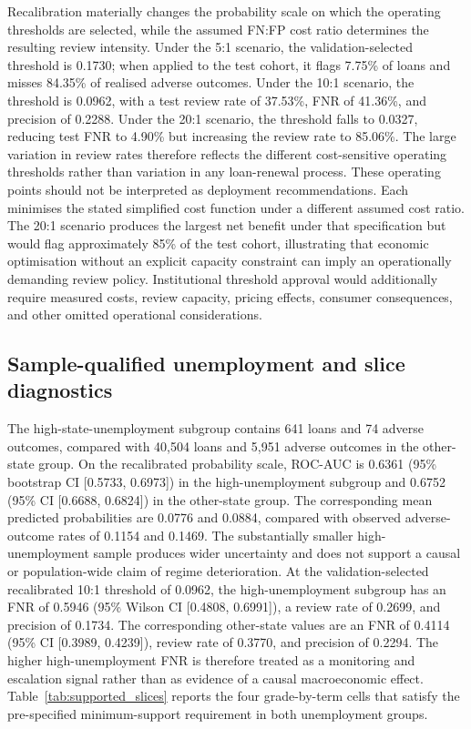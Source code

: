 \documentclass[10pt]{article}
\begin{document}
Recalibration materially changes the probability scale on which the operating thresholds are selected, while the assumed FN:FP cost ratio determines the resulting review intensity. Under the 5:1 scenario, the validation-selected threshold is 0.1730; when applied to the test cohort, it flags 7.75\% of loans and misses 84.35\% of realised adverse outcomes. Under the 10:1 scenario, the threshold is 0.0962, with a test review rate of 37.53\%, FNR of 41.36\%, and precision of 0.2288. Under the 20:1 scenario, the threshold falls to 0.0327, reducing test FNR to 4.90\% but increasing the review rate to 85.06\%. The large variation in review rates therefore reflects the different cost-sensitive operating thresholds rather than variation in any loan-renewal process. These operating points should not be interpreted as deployment recommendations. Each minimises the stated simplified cost function under a different assumed cost ratio. The 20:1 scenario produces the largest net benefit under that specification but would flag approximately 85\% of the test cohort, illustrating that economic optimisation without an explicit capacity constraint can imply an operationally demanding review policy. Institutional threshold approval would additionally require measured costs, review capacity, pricing effects, consumer consequences, and other omitted operational considerations.


\subsection{Sample-qualified unemployment and slice diagnostics}
\label{sec:subgroup}

The high-state-unemployment subgroup contains 641 loans and 74 adverse outcomes, compared with 40,504 loans and 5,951 adverse outcomes in the other-state group. On the recalibrated probability scale, ROC-AUC is 0.6361 (95\% bootstrap CI [0.5733, 0.6973]) in the high-unemployment subgroup and 0.6752 (95\% CI [0.6688, 0.6824]) in the other-state group. The corresponding mean predicted probabilities are 0.0776 and 0.0884, compared with observed adverse-outcome rates of 0.1154 and 0.1469. The substantially smaller high-unemployment sample produces wider uncertainty and does not support a causal or population-wide claim of regime deterioration. At the validation-selected recalibrated 10:1 threshold of 0.0962, the high-unemployment subgroup has an FNR of 0.5946 (95\% Wilson CI [0.4808, 0.6991]), a review rate of 0.2699, and precision of 0.1734. The corresponding other-state values are an FNR of 0.4114 (95\% CI [0.3989, 0.4239]), review rate of 0.3770, and precision of 0.2294. The higher high-unemployment FNR is therefore treated as a monitoring and escalation signal rather than as evidence of a causal macroeconomic effect. Table~\ref{tab:supported_slices} reports the four grade-by-term cells that satisfy the pre-specified minimum-support requirement in both unemployment groups.
\end{document}
